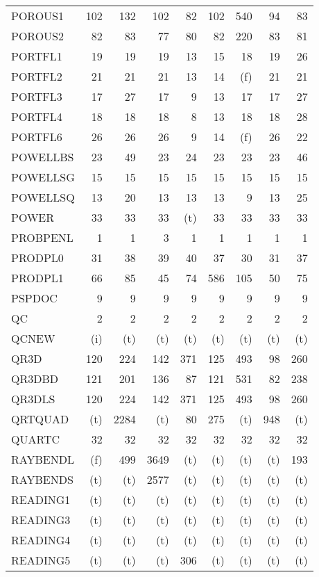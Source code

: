 \documentclass[11pt,twoside]{article}
\begin{document}
{\begin{longtable}[c]{|l|r|r|r|r|r|r|r|r|}
 POROUS1 & 102 & 132 & 102 & 82 & 102 & 540 & 94 & 83 \\
 POROUS2 & 82 & 83 & 77 & 80 & 82 & 220 & 83 & 81 \\
 PORTFL1 & 19 & 19 & 19 & 13 & 15 & 18 & 19 & 26 \\
 PORTFL2 & 21 & 21 & 21 & 13 & 14 & (f) & 21 & 21 \\
 PORTFL3 & 17 & 27 & 17 & 9 & 13 & 17 & 17 & 27 \\
 PORTFL4 & 18 & 18 & 18 & 8 & 13 & 18 & 18 & 28 \\
 PORTFL6 & 26 & 26 & 26 & 9 & 14 & (f) & 26 & 22 \\
 POWELLBS & 23 & 49 & 23 & 24 & 23 & 23 & 23 & 46 \\
 POWELLSG & 15 & 15 & 15 & 15 & 15 & 15 & 15 & 15 \\
 POWELLSQ & 13 & 20 & 13 & 13 & 13 & 9 & 13 & 25 \\
 POWER & 33 & 33 & 33 & (t) & 33 & 33 & 33 & 33 \\
 PROBPENL & 1 & 1 & 3 & 1 & 1 & 1 & 1 & 1 \\
 PRODPL0 & 31 & 38 & 39 & 40 & 37 & 30 & 31 & 37 \\
 PRODPL1 & 66 & 85 & 45 & 74 & 586 & 105 & 50 & 75 \\
 PSPDOC & 9 & 9 & 9 & 9 & 9 & 9 & 9 & 9 \\
 QC & 2 & 2 & 2 & 2 & 2 & 2 & 2 & 2 \\
 QCNEW & (i) & (t) & (t) & (t) & (t) & (t) & (t) & (t) \\
 QR3D & 120 & 224 & 142 & 371 & 125 & 493 & 98 & 260 \\
 QR3DBD & 121 & 201 & 136 & 87 & 121 & 531 & 82 & 238 \\
 QR3DLS & 120 & 224 & 142 & 371 & 125 & 493 & 98 & 260 \\
 QRTQUAD & (t) & 2284 & (t) & 80 & 275 & (t) & 948 & (t) \\
 QUARTC & 32 & 32 & 32 & 32 & 32 & 32 & 32 & 32 \\
 RAYBENDL & (f) & 499 & 3649 & (t) & (t) & (t) & (t) & 193 \\
 RAYBENDS & (t) & (t) & 2577 & (t) & (t) & (t) & (t) & (t) \\
 READING1 & (t) & (t) & (t) & (t) & (t) & (t) & (t) & (t) \\
 READING3 & (t) & (t) & (t) & (t) & (t) & (t) & (t) & (t) \\
 READING4 & (t) & (t) & (t) & (t) & (t) & (t) & (t) & (t) \\
 READING5 & (t) & (t) & (t) & 306 & (t) & (t) & (t) & (t) \\

\end{longtable}}
\end{document}
